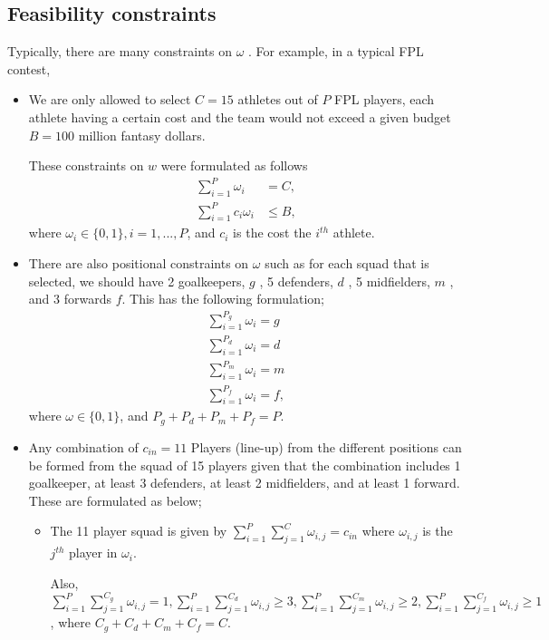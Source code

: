 \documentclass[12pt,oneside,a4paper]{book}
\theoremstyle{definition}
\theoremstyle{remark}
\begin{document}
				\subsection{Feasibility constraints}
					Typically, there are many constraints on $\omega$ . For example, in a typical FPL contest,
					\begin{itemize}
						\item We are only allowed to select $C = 15$ athletes out of $P$ FPL players, each athlete having a certain cost and the team would not exceed a given budget $B=100$ million fantasy dollars.

						These constraints on $w$ were formulated as follows
						\[
						\begin{aligned}
							\sum_{i=1}^{P}\omega_i &=C,\\
							\sum_{i=1}^{P}c_i\omega_{i} &\le B,
						\end{aligned}
						\]
						where $\omega_{i} \in \{0,1\}, i = 1, ..., P$, and $c_i$ is the cost the $i^{th}$ athlete.
						\item There are also positional constraints on $\omega$ such as for each squad that is selected, we should have 2 goalkeepers, $g$ , 5 defenders, $d$ , 5 midfielders, $m$ , and 3 forwards $f$. This has the following formulation;
						\[
						\begin{aligned}
							\sum_{i=1}^{P_g}\omega_{i} =g\\
							\sum_{i=1}^{P_d}\omega_{i} =d\\
							\sum_{i=1}^{P_m}\omega_{i} =m\\
							\sum_{i=1}^{P_f}\omega_{i} =f,
						\end{aligned}
						\]
						where $\omega \in \{0,1\}$, and $P_g+P_d+P_m+P_f=P$.
						\item Any combination of $c_{in}=11$ Players (line-up) from the different positions can be formed from the squad of 15 players given that the combination includes 1 goalkeeper, at least 3 defenders, at least 2 midfielders, and at least 1 forward. These are formulated as below;
						\begin{itemize}
							\item The 11 player squad is given by $\sum_{i=1}^{P}\sum_{j=1}^{C}\omega_{i,j} = c_{in}$ where $\omega_{i,j}$ is the $j^{th}$ player in $\omega_{i}$.

							Also, $\sum_{i=1}^{P}\sum_{j=1}^{C_g}\omega_{i,j} = 1, \sum_{i=1}^{P}\sum_{j=1}^{C_d}\omega_{i,j} \ge 3, \sum_{i=1}^{P}\sum_{j=1}^{C_m}\omega_{i,j} \ge 2, \sum_{i=1}^{P}\sum_{j=1}^{C_f}\omega_{i,j} \ge 1$, where $C_g+C_d+C_m+C_f = C$.
						\end{itemize}

					\end{itemize}
\end{document}
